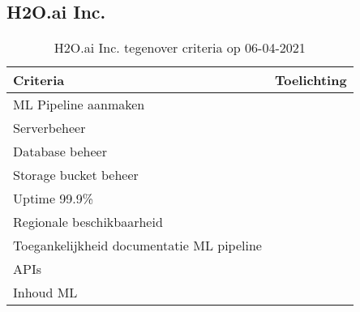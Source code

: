 \subsection*{H2O.ai Inc.}\label{appendix:detailed-overview-of-cloud-computing-platforms:h2o.ai-inc}
\begin{table}[hbt!]
  \centering
  \begin{tabular}{|p{.2\linewidth}|p{.74\linewidth}|}
  \hline
  \textbf{Criteria} & \textbf{Toelichting} \\ \hline
    ML Pipeline \newline aanmaken
    &

    \\ \hline

    Serverbeheer
    &

    \\ \hline

    Database beheer
    &

    \\ \hline

    Storage \newline bucket beheer
    &

    \\ \hline

    Uptime 99.9\%
    &

    \\ \hline

    Regionale \newline beschikbaarheid
    &

    \\ \hline

    Toegankelijkheid documentatie ML pipeline
    &

    \\ \hline

    APIs
    &

    \\ \hline

    Inhoud ML
    &

    \\ \hline
  \end{tabular}
  \caption{H2O.ai Inc. tegenover criteria op 06-04-2021}
  \label{table:h2o.ai-inc-against-criteria}
\end{table}